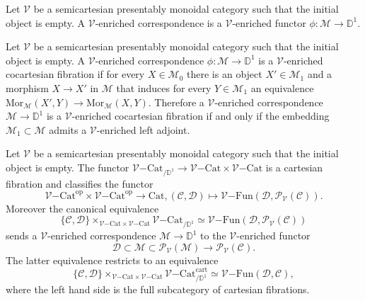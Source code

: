\documentclass[10pt,oneside]{article}
\numberwithin{equation}{section} %
\numberwithin{figure}{section} %
\theoremstyle{plain}
\theoremstyle{definition}
\newcommand{\bD}{{\mathbb D}}
\newcommand{\mC}{{\mathcal C}}
\newcommand{\mD}{{\mathcal D}}
\newcommand{\mM}{{\mathcal M}}
\newcommand{\mP}{{\mathcal P}}
\newcommand{\mV}{{\mathcal V}}
\newcommand{\op}{\mathrm{op}}
\newcommand{\Cat}{\mathrm{Cat}}
\newcommand{\Fun}{\mathrm{Fun}}
\newcommand{\cart}{{\mathrm{cart}}}
\newcommand{\Mor}{{\mathrm{Mor}}}
\begin{document}
\begin{definition}
Let $\mV$ be a semicartesian presentably monoidal category such that the initial object is empty.
A $\mV$-enriched correspondence is a $\mV$-enriched
functor $\phi: \mM \to \bD^1.$
    
\end{definition}

\begin{remark}
Let $\mV$ be a semicartesian presentably monoidal category such that the initial object is empty.
A $\mV$-enriched correspondence $\phi: \mM \to \bD^1$ is a $\mV$-enriched
cocartesian fibration if for every $X \in \mM_0 $ there is an object $X' \in \mM_1 $
and a morphism $X \to X'$ in $\mM$ that induces for every $Y \in \mM_1$ an equivalence
$ \Mor_\mM(X',Y) \to \Mor_\mM(X,Y).$
Therefore a $\mV$-enriched correspondence $\mM \to \bD^1$ 
is a $\mV$-enriched cocartesian fibration
if and only if the embedding $\mM_1 \subset \mM$ admits a $\mV$-enriched left adjoint.
    
\end{remark}


\begin{theorem}\label{Groprof}
	
Let $\mV$ be a semicartesian presentably monoidal category such that the initial object is empty.
The functor $ {\mV\mathrm{-}\Cat}_{/\bD^1} \to {\mV\mathrm{-}\Cat} \times {\mV\mathrm{-}\Cat}$
is a cartesian fibration and classifies the functor
$${\mV\mathrm{-}\Cat}^\op \times {\mV\mathrm{-}\Cat}^\op \to \Cat, (\mC,\mD) \mapsto {\mV\mathrm{-}\Fun}(\mD, \mP_\mV(\mC)).$$
Moreover the canonical equivalence
$$ \{\mC,\mD\} \times_{{\mV\mathrm{-}\Cat} \times  {\mV\mathrm{-}\Cat}} {\mV\mathrm{-}\Cat}_{/\bD^1} \simeq {\mV\mathrm{-}\Fun}(\mD, \mP_\mV(\mC))$$
sends a $\mV$-enriched correspondence $\mM\to \bD^1$
to the $\mV$-enriched functor $$\mD \subset \mM \subset \mP_\mV(\mM) \to \mP_\mV(\mC).$$
The latter equivalence restricts to an equivalence
$$ \{\mC,\mD\} \times_{{\mV\mathrm{-}\Cat} \times  {\mV\mathrm{-}\Cat}} {\mV\mathrm{-}\Cat}^\cart_{/\bD^1} \simeq {\mV\mathrm{-}\Fun}(\mD, \mC), $$
where the left hand side is the full subcategory of cartesian fibrations.
\end{theorem}
\end{document}
